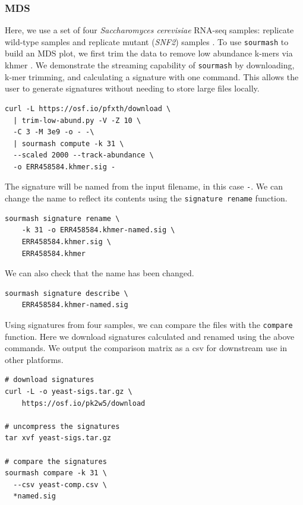 \documentclass[10pt,a4paper,twocolumn]{article}
\begin{document}
\subsubsection*{MDS}

Here, we use a set of four \textit{Saccharomyces cerevisiae} RNA-seq samples: replicate wild-type samples and replicate mutant (\textit{SNF2}) samples \cite{schurch2016many}. To use \lstinline{sourmash} to build an MDS plot, we first trim the data to remove low abundance k-mers via khmer \cite{crusoe2015khmer}. We demonstrate the streaming capability of \lstinline{sourmash} by downloading, k-mer trimming, and calculating a signature with one command. This allows the user to generate signatures without needing to store large files locally.

\begin{lstlisting}
curl -L https://osf.io/pfxth/download \ 
  | trim-low-abund.py -V -Z 10 \ 
  -C 3 -M 3e9 -o - -\ 
  | sourmash compute -k 31 \ 
  --scaled 2000 --track-abundance \ 
  -o ERR458584.khmer.sig -
\end{lstlisting}

The signature will be named from the input filename, in this case \lstinline{-}. We can change the name to reflect its contents using the \lstinline{signature rename} function. 

\begin{lstlisting}
sourmash signature rename \ 
    -k 31 -o ERR458584.khmer-named.sig \ 
    ERR458584.khmer.sig \ 
    ERR458584.khmer 
\end{lstlisting}

We can also check that the name has been changed. 

\begin{lstlisting}
sourmash signature describe \ 
    ERR458584.khmer-named.sig
\end{lstlisting}

Using signatures from four samples, we can compare the files with the \lstinline{compare} function. Here we download signatures calculated and renamed using the above commands. We output the comparison matrix as a csv for downstream use in other platforms.

\begin{lstlisting}
# download signatures
curl -L -o yeast-sigs.tar.gz \ 
    https://osf.io/pk2w5/download

# uncompress the signatures
tar xvf yeast-sigs.tar.gz

# compare the signatures
sourmash compare -k 31 \ 
  --csv yeast-comp.csv \ 
  *named.sig
\end{lstlisting}
\end{document}
